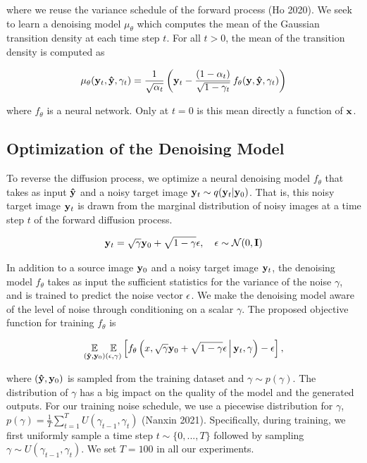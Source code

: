 \documentclass{article}
\begin{document}
where we reuse the variance schedule of the forward process (Ho 2020). We seek to learn a denoising model $\mu_{\theta}$ which computes the mean of the Gaussian transition density at each time step $t$. For all $t > 0$, the mean of the transition density is computed as

\begin{equation}
\mu_{\theta}(\bold{y}_t, \bold{\hat{y}}, \gamma_t) = \frac{1}{\sqrt{\alpha_t}} \left(\bold{y}_t - \frac{(1 - \alpha_t)}{\sqrt{1 - \gamma_t}} \, f_{\theta}(\bold{y}, \bold{\hat{y}}, \gamma_t) \right)
\end{equation}

where $f_{\theta}$ is a neural network. Only at $t=0$ is this mean directly a function of $\bold{x}$. 

\subsection{Optimization of the Denoising Model}

To reverse the diffusion process, we optimize a neural denoising model $f_{\theta}$ that takes as input $\bold{\hat{y}}$ and a noisy target image $\bold{y}_t \sim q(\bold{y}_t|\bold{y}_0)$. That is, this noisy target image $\bold{y}_t$ is drawn from the marginal distribution of noisy images at a time step $t$ of the forward diffusion process. 

\begin{equation}
\bold{y}_t = \sqrt{\gamma} \bold{y}_0 + \sqrt{1 - \gamma} \bold{\epsilon}, \quad \bold{\epsilon} \sim \mathcal{N}(0, \bold{I})
\end{equation}

In addition to a source image $\bold{y}_{0}$ and a noisy target image $\bold{y}_t$, the denoising model $f_{\theta}$ takes as input the sufficient statistics for the variance of the noise $\gamma$, and is trained to predict the noise vector $\bold{\epsilon}$. We make the denoising model aware of the level of noise through conditioning on a scalar $\gamma$. The proposed objective function for training $f_{\theta}$ is

\begin{equation}
\underset{(\bold{\hat{y}},\bold{y}_{0})}{\mathbb{E}}\underset{(\epsilon,\gamma)}{\mathbb{E}} \left[ f_{\theta}\left(x, \sqrt{\gamma} \bold{y}_0 + \sqrt{1 - \gamma} \epsilon \, \middle|\, \bold{y}_{t}, \gamma\right) - \epsilon \right],
\end{equation} 

where $(\bold{\hat{y}},\bold{y}_{0})$ is sampled from the training dataset and $\gamma \sim p(\gamma)$. The distribution of $\gamma$ has a big impact on the quality of the model and the generated outputs. For our training noise schedule, we use a piecewise distribution for $\gamma$, $p(\gamma) = \frac{1}{T}\sum_{t=1}^{T} U(\gamma_{t-1}, \gamma_t)$ (Nanxin 2021). Specifically, during training, we first uniformly sample a time step $t \sim \{0, ..., T\}$ followed by sampling $\gamma \sim U(\gamma_{t-1}, \gamma_t)$. We set $T = 100$ in all our experiments.
\end{document}
